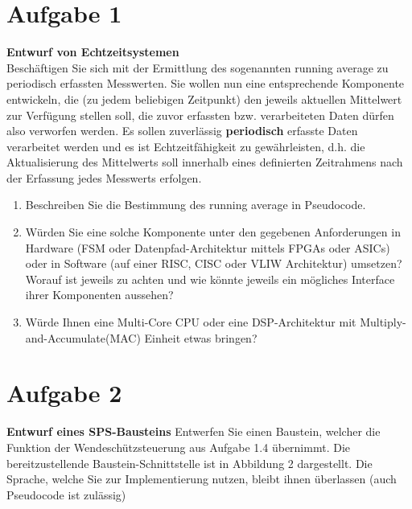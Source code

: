 \documentclass[12pt,a4paper,ngerman]{article}
\begin{document}


%
%

\section{Aufgabe 1}


\begin{framed}
\textbf{Entwurf von Echtzeitsystemen}\\
Beschäftigen Sie sich mit der Ermittlung des sogenannten running average zu periodisch erfassten Messwerten. Sie wollen nun eine entsprechende Komponente entwickeln, die (zu jedem beliebigen Zeitpunkt) den jeweils aktuellen Mittelwert zur Verfügung stellen soll, die zuvor erfassten bzw. verarbeiteten Daten dürfen also verworfen werden. Es sollen zuverlässig \textbf{periodisch} erfasste Daten verarbeitet werden und es ist Echtzeitfähigkeit zu gewährleisten, d.h. die Aktualisierung des Mittelwerts soll innerhalb eines definierten Zeitrahmens nach der Erfassung jedes Messwerts erfolgen.
\begin{enumerate}
\item Beschreiben Sie die Bestimmung des running average in Pseudocode.
\item Würden Sie eine solche Komponente unter den gegebenen Anforderungen in Hardware (FSM oder Datenpfad-Architektur mittels FPGAs oder ASICs) oder in Software (auf einer RISC, CISC oder VLIW Architektur) umsetzen? Worauf ist jeweils zu achten und wie könnte jeweils ein mögliches Interface ihrer Komponenten aussehen?
\item Würde Ihnen eine Multi-Core CPU oder eine DSP-Architektur mit Multiply-and-Accumulate(MAC) Einheit etwas bringen?
\end{enumerate}
\end{framed}



\pagebreak

\section{Aufgabe 2}
\begin{framed}
\textbf{Entwurf eines SPS-Bausteins}
Entwerfen Sie einen Baustein, welcher die Funktion der Wendeschützsteuerung aus Aufgabe 1.4 übernimmt. Die bereitzustellende Baustein-Schnittstelle ist in Abbildung 2 dargestellt. Die Sprache, welche Sie zur Implementierung nutzen, bleibt ihnen überlassen (auch Pseudocode ist zulässig)
\end{framed}
%
 
\end{document}
